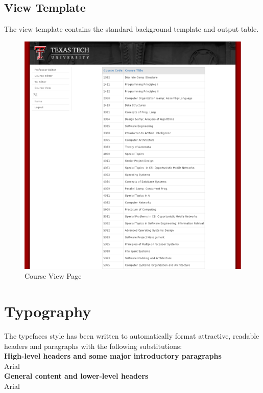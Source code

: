 \subsection{View Template}
The view template contains the standard background template and output table.
\begin{figure}[H]
	\centering
	\includegraphics[scale=0.5]{CourseView.png}
	\caption{Course View Page}
\end{figure}
\section{Typography}
The typefaces style has been written to automatically format attractive, readable headers and paragraphs with the following substitutions:\\

\noindent\textbf{High-level headers and some major introductory paragraphs}\\
Arial\\

\noindent\textbf{General content and lower-level headers}\\
Arial

